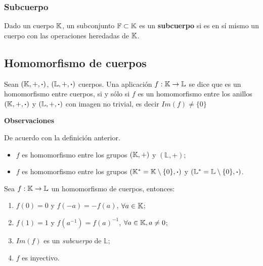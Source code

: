 \subsubsection{Subcuerpo}
\vspace{1em}
\begin{fmd-definition}[Subcuerpo]
	Dado un cuerpo $\mathbb{K}$, un subconjunto $\mathbb{F} \subset \mathbb{K}$ es un \textbf{subcuerpo} si es en sí mismo un cuerpo con las operaciones heredadas de $\mathbb{K}$.
\end{fmd-definition}

\subsection{Homomorfismo de cuerpos}
\vspace{1em}
\begin{fmd-definition}
	Sean $(\mathbb{K}, +, \boldsymbol{\cdot})$, $(\mathbb{L}, +, \boldsymbol{\cdot})$ cuerpos. Una aplicación $f: \mathbb{K} \rightarrow \mathbb{L}$ se dice que es un homomorfismo entre cuerpos, si y sólo si $f$ es un homomorfismo entre los anillos $(\mathbb{K}, +, \boldsymbol{\cdot})$ y $(\mathbb{L}, +, \boldsymbol{\cdot})$ con imagen no trivial, es decir $Im(f) \ne \{ 0 \}$
\end{fmd-definition}

\textbf{Observaciones}

De acuerdo con la definición anterior.
\begin{itemize}
	\item $f$ es homomorfismo entre los grupos $(\mathbb{K}, +)$ y $(\mathbb{L}, +)$;
	\item $f$ es homomorfismo entre los grupos $(\mathbb{K}^* =  \mathbb{K} \setminus \{0\}, \boldsymbol{\cdot})$ y $(\mathbb{L}^* = \mathbb{L} \setminus \{0\}, \boldsymbol{\cdot})$.
\end{itemize}

\begin{fmd-theorem}
	Sea $f: \mathbb{K} \rightarrow \mathbb{L}$ un homomorfismo de cuerpos, entonces:
	\begin{enumerate}[label=\alph*)]
		\item $f(0) = 0$ y $f(-a) = -f(a)$, $\forall a \in \mathbb{K}$;
		\item $f(1) = 1$ y $f(a^{-1}) = f(a)^{-1}$, $\forall a \in \mathbb{K}, a \ne 0$;
		\item $Im(f)$ es un \textit{subcuerpo} de $\mathbb{L}$;
		\item $f$ es inyectivo.
 	\end{enumerate}
\end{fmd-theorem}

